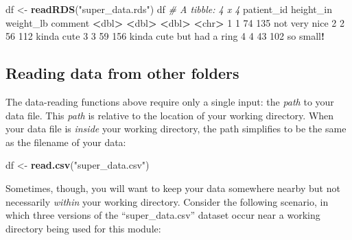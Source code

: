 \documentclass[
]{book}
\newenvironment{Shaded}{\begin{snugshade}}{\end{snugshade}}
\newcommand{\CommentTok}[1]{\textcolor[rgb]{0.56,0.35,0.01}{\textit{#1}}}
\newcommand{\DecValTok}[1]{\textcolor[rgb]{0.00,0.00,0.81}{#1}}
\newcommand{\ErrorTok}[1]{\textcolor[rgb]{0.64,0.00,0.00}{\textbf{#1}}}
\newcommand{\KeywordTok}[1]{\textcolor[rgb]{0.13,0.29,0.53}{\textbf{#1}}}
\newcommand{\NormalTok}[1]{#1}
\newcommand{\OperatorTok}[1]{\textcolor[rgb]{0.81,0.36,0.00}{\textbf{#1}}}
\newcommand{\StringTok}[1]{\textcolor[rgb]{0.31,0.60,0.02}{#1}}
\begin{document}
\begin{Shaded}
\begin{Highlighting}[]
\NormalTok{df <-}\StringTok{ }\KeywordTok{readRDS}\NormalTok{(}\StringTok{"super_data.rds"}\NormalTok{)}
\NormalTok{df}
\CommentTok{# A tibble: 4 x 4}
\NormalTok{  patient_id height_in weight_lb comment                  }
       \OperatorTok{<}\NormalTok{dbl}\OperatorTok{>}\StringTok{     }\ErrorTok{<}\NormalTok{dbl}\OperatorTok{>}\StringTok{     }\ErrorTok{<}\NormalTok{dbl}\OperatorTok{>}\StringTok{ }\ErrorTok{<}\NormalTok{chr}\OperatorTok{>}\StringTok{                    }
\DecValTok{1}          \DecValTok{1}        \DecValTok{74}       \DecValTok{135}\NormalTok{ not very nice            }
\DecValTok{2}          \DecValTok{2}        \DecValTok{56}       \DecValTok{112}\NormalTok{ kinda cute               }
\DecValTok{3}          \DecValTok{3}        \DecValTok{59}       \DecValTok{156}\NormalTok{ kinda cute but had a ring}
\DecValTok{4}          \DecValTok{4}        \DecValTok{43}       \DecValTok{102}\NormalTok{ so small}\OperatorTok{!}\StringTok{                }
\end{Highlighting}
\end{Shaded}

\hypertarget{reading-data-from-other-folders}{%
\subsection*{Reading data from other folders}\label{reading-data-from-other-folders}}

The data-reading functions above require only a single input: the \emph{path} to your data file. This \emph{path} is relative to the location of your working directory. When your data file is \emph{inside} your working directory, the path simplifies to be the same as the filename of your data:

\begin{Shaded}
\begin{Highlighting}[]
\NormalTok{df <-}\StringTok{ }\KeywordTok{read.csv}\NormalTok{(}\StringTok{"super_data.csv"}\NormalTok{)}
\end{Highlighting}
\end{Shaded}

Sometimes, though, you will want to keep your data somewhere nearby but not necessarily \emph{within} your working directory. Consider the following scenario, in which three versions of the ``super\_data.csv'' dataset occur near a working directory being used for this module:
\end{document}
